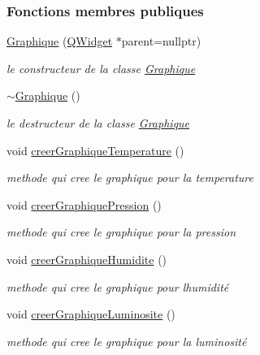 \subsubsection*{Fonctions membres publiques}
\begin{DoxyCompactItemize}
\item 
\hyperlink{class_graphique_a3aec0a5aaae78f0726771dea67af69b4}{Graphique} (\hyperlink{class_q_widget}{Q\+Widget} $\ast$parent=nullptr)
\begin{DoxyCompactList}\small\item\em le constructeur de la classe \hyperlink{class_graphique}{Graphique} \end{DoxyCompactList}\item 
\hyperlink{class_graphique_a1bb866eb859b961cf0cdddc1b289a773}{$\sim$\+Graphique} ()
\begin{DoxyCompactList}\small\item\em le destructeur de la classe \hyperlink{class_graphique}{Graphique} \end{DoxyCompactList}\item 
void \hyperlink{class_graphique_ad9b976804bafcbfe451d89fd35729d16}{creer\+Graphique\+Temperature} ()
\begin{DoxyCompactList}\small\item\em methode qui cree le graphique pour la temperature \end{DoxyCompactList}\item 
void \hyperlink{class_graphique_adc50b5ae7a54dd576c99e74ec6bf74c5}{creer\+Graphique\+Pression} ()
\begin{DoxyCompactList}\small\item\em methode qui cree le graphique pour la pression \end{DoxyCompactList}\item 
void \hyperlink{class_graphique_a19d6deef2d11e95093a343d49f75d14e}{creer\+Graphique\+Humidite} ()
\begin{DoxyCompactList}\small\item\em methode qui cree le graphique pour l\textquotesingle{}humidité \end{DoxyCompactList}\item 
void \hyperlink{class_graphique_a3b55b9c4732856e1b25bef167c25ac4c}{creer\+Graphique\+Luminosite} ()
\begin{DoxyCompactList}\small\item\em methode qui cree le graphique pour la luminosité \end{DoxyCompactList}\item 

\end{DoxyCompactItemize}
